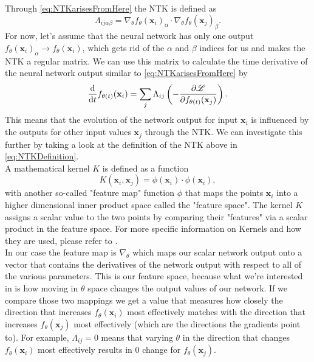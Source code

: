 Through \cref{eq:NTKarisesFromHere} the NTK is defined as 
\begin{equation}\label{eq:NTKDefinition}
	\Lambda_{ij\alpha\beta} = \nabla_\theta f_\theta(\mathbf{x}_i)_\alpha \cdot \nabla_\theta f_\theta(\mathbf{x}_j)_\beta.
\end{equation}
For now, let's assume that the neural network has only one output $f_\theta(\mathbf{x}_i)_\alpha \rightarrow f_\theta(\mathbf{x}_i)$, which gets rid of the $\alpha$ and $\beta$ indices for us and makes the NTK a regular matrix. We can use this matrix to calculate the time derivative of the neural network output similar to \cref{eq:NTKarisesFromHere} by 
\begin{equation}\label{eq:NTKExplanation}
	\frac{\mathrm{d}}{\mathrm{d}t}f_{\theta(t)}(\mathbf{x}_i) = \sum_j \Lambda_{ij} \left(- \frac{\partial\mathscr{L}}{\partial f_{\theta(t)}(\mathbf{x}_j)}\right).
\end{equation}
This means that the evolution of the network output for input $\mathbf{x}_i$ is influenced by the outputs for other input values $\mathbf{x}_j$ through the NTK. We can investigate this further by taking a look at the definition of the NTK above in \cref{eq:NTKDefinition}. \\
A mathematical kernel $K$ is defined as a function
\begin{equation}
	K(\mathbf{x}_i, \mathbf{x}_j) = \phi(\mathbf{x}_i)\cdot\phi(\mathbf{x}_i),
\end{equation}
with another so-called "feature map" function $\phi$ that maps the points $\mathbf{x}_i$ into a higher dimensional inner product space called the "feature space". The kernel $K$ assigns a scalar value to the two points by comparing their "features" via a scalar product in the feature space. For more specific information on Kernels and how they are used, please refer to \cite{KernelMethod}.\\
In our case the feature map is $\nabla_\theta$ which maps our scalar network output onto a vector that contains the derivatives of the network output with respect to all of the various parameters. This is our feature space, because what we're interested in is how moving in $\theta$ space changes the output values of our network. If we compare those two mappings we get a value that measures how closely the direction that increases $f_\theta(\mathbf{x}_i)$ most effectively matches with the direction that increases $f_\theta(\mathbf{x}_j)$ most effectively  (which are the directions the gradients point to). For example, $\Lambda_{ij}=0$ means that varying $\theta$ in the direction that changes $f_\theta(\mathbf{x}_i)$ most effectively results in 0 change for $f_\theta(\mathbf{x}_j)$.\\

